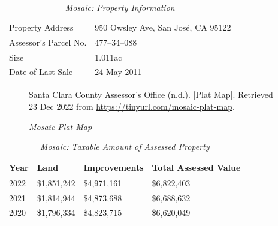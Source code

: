 \begin{table}[htbp]
  \SingleSpacing%
  \caption[Mosaic: Property Information]{\textit{Mosaic: Property Information}}\label{tab:mosaic-prop-info}
  \begin{tabular}{ll}
    \toprule
    Property Address      & 950 Owsley Ave, San José, CA 95122 \\
    Assessor's Parcel No. & 477–34–088 \\
    Size                  & 1.011ac \\
    Date of Last Sale     & 24 May 2011 \\
    \bottomrule
  \end{tabular}
\end{table}

\begin{figure}[hbtp]
  \caption[Mosaic Plat Map]{\textit{Mosaic Plat Map}}%
  \label{fig:mosaic-plat-map}
  {Santa Clara County Assessor's Office (n.d.). [Plat Map]. Retrieved 23 Dec 2022 from  \url{https://tinyurl.com/mosaic-plat-map}.}
\end{figure}

\begin{table}[hbtp]
  \SingleSpacing%
  \caption[Mosaic: Taxable Amount of Assessed Propery]{\textit{Mosaic: Taxable Amount of Assessed Property}}%
  \label{tab:mosaic-taxable-amount}
  \begin{tabular}{llll}
    \toprule
    Year & Land        & Improvements & Total Assessed Value \\
    \midrule
    2022 & \$1,851,242 & \$4,971,161 & \$6,822,403 \\
    2021 & \$1,814,944 & \$4,873,688 & \$6,688,632 \\
    2020 & \$1,796,334 & \$4,823,715 & \$6,620,049 \\
    \bottomrule
  \end{tabular}
\end{table}

